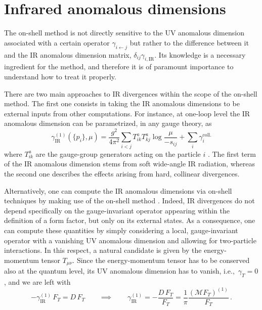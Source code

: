 \section{Infrared anomalous dimensions}
\label{app:IRanomalousdimensions}

The on-shell method is not directly sensitive to the UV anomalous dimension associated with a certain operator $\gamma_{i\leftarrow j}$ but rather to the difference between it and the IR anomalous dimension matrix, $\delta_{ij} \gamma_{i,\text{IR}}$. 
Its knowledge is a necessary ingredient for the method, and therefore it is of paramount importance to understand how to treat it properly. 

There are two main approaches to IR divergences within the scope of the on-shell method. 
The first one consists in taking the IR anomalous dimensions to be external inputs from other computations. 
For instance, at one-loop level the IR anomalous dimension can be parametrized, in any gauge theory, as 
%
\begin{equation}
    \gamma_{\text{IR}}^{(1)} (\{p_i\}, \mu) = \frac{g^2}{4 \pi^2} \sum_{i<j} T^a_{ik} T^a_{kj} \log \frac{\mu}{-s_{ij}} + \sum_i \gamma_i^{\text{coll.}}
\end{equation}
%
where $T_{ik}^a$ are the gauge-group generators acting on the particle $i$ \cite{Becher:2009cu}. 
The first term of the IR anomalous dimension stems from soft wide-angle IR radiation, whereas the second one describes the effects arising from hard, collinear divergences. 

Alternatively, one can compute the IR anomalous dimensions via on-shell techniques by making use of the on-shell method \cite{Caron-Huot:2016cwu}.
%
Indeed,
IR divergences do not depend specifically on the gauge-invariant operator appearing within the definition of a form factor, but only on its external states. As a consequence, one can compute these quantities by simply considering a local, gauge-invariant operator with a vanishing UV anomalous dimension and allowing for two-particle interactions.
In this respect, a natural candidate is given by the energy-momentum tensor $T_{\mu\nu}$.
Since the energy-momentum tensor has to be conserved also at the quantum level, its UV anomalous dimension has to vanish, i.e.,~$\gamma_{T} = 0$, and we are left with 
\begin{equation}
\label{eq:Master_Formula_LO}
- \gamma_{\text{IR}}^{(1)} \, F_T = D \, F_T \qquad \implies \qquad \gamma_{\text{IR}}^{(1)} = -\frac{D \, F_T}{F_T} = \frac{1}{\pi} \frac{(\mathcal M F_T)^{(1)} }{F_T}\,.
\end{equation}

